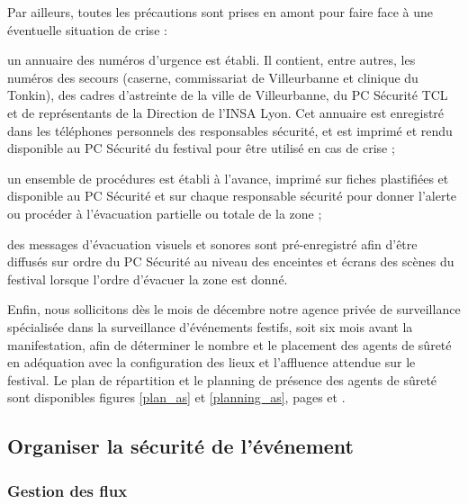 \documentclass[hidelinks, paper=a4, fontsize=13pt]{report}
\begin{document}
Par ailleurs, toutes les précautions sont prises en amont pour faire face à une éventuelle situation de crise :
\begin{list}{•}{}
	\item un annuaire des numéros d'urgence est établi. Il contient, entre autres, les numéros des secours (caserne, commissariat de Villeurbanne et clinique du Tonkin), des cadres d'astreinte de la ville de Villeurbanne, du PC Sécurité TCL et de représentants de la Direction de l'INSA Lyon. Cet annuaire est enregistré dans les téléphones personnels des responsables sécurité, et est imprimé et rendu disponible au PC Sécurité du festival pour être utilisé en cas de crise ;
	\item un ensemble de procédures est établi à l'avance, imprimé sur fiches plastifiées et disponible au PC Sécurité et sur chaque responsable sécurité pour donner l'alerte ou procéder à l'évacuation partielle ou totale de la zone ;
	\item des messages d'évacuation visuels et sonores sont pré-enregistré afin d'être diffusés sur ordre du PC Sécurité au niveau des enceintes et écrans des scènes du festival lorsque l'ordre d'évacuer la zone est donné.\\
\end{list}

Enfin, nous sollicitons dès le mois de décembre notre agence privée de surveillance spécialisée dans la surveillance d'événements festifs, soit six mois avant la manifestation, afin de déterminer le nombre et le placement des agents de sûreté en adéquation avec la configuration des lieux et l'affluence attendue sur le festival. Le plan de répartition et le planning de présence des agents de sûreté sont disponibles figures \ref{plan_as} et \ref{planning_as}, pages \pageref{plan_as} et \pageref{planning_as}.
 
\subsection{Organiser la sécurité de l'événement}

\subsubsection{Gestion des flux}
\label{gestion_flux}
\end{document}
